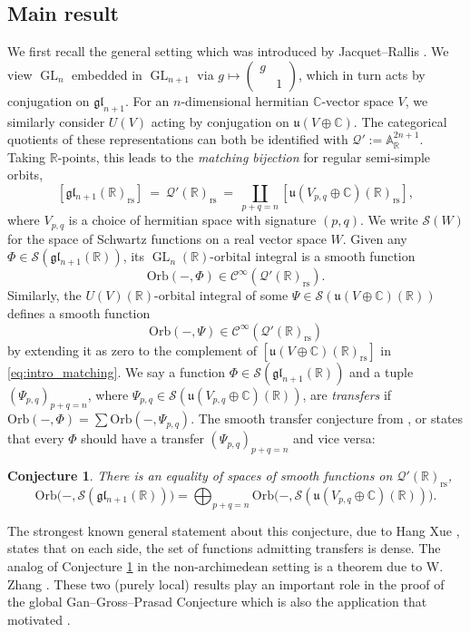 \documentclass[reqno, 11pt]{amsart} %
\numberwithin{equation}{section}
\theoremstyle{plain}
\newtheorem{conjecture}[theorem]{Conjecture}
\theoremstyle{definition}
\theoremstyle{remark}
\newcommand{\mr}{\mathrm}
\newcommand{\mbA}{\mathbb{A}}
\newcommand{\mbC}{\mathbb{C}}
\newcommand{\mbR}{\mathbb{R}}
\newcommand{\mcC}{\mathcal{C}}
\newcommand{\mcQ}{\mathcal{Q}}
\newcommand{\mcS}{\mathcal{S}}
\newcommand{\mfg}{\mathfrak{g}}
\newcommand{\mfl}{\mathfrak{l}}
\newcommand{\mfu}{\mathfrak{u}}
\newcommand{\rs}{\mr{rs}}
\newcommand{\mfgl}{\mfg\mfl}
\newcommand{\bbR}{\mathbb R}
\newcommand{\lie}[1]{ \mathfrak{#1}}
\DeclareMathOperator{\GL}{GL}
\newcommand{\Orb}{\mathrm{Orb}}
\begin{document}
\subsection{Main result}
We first recall the general setting which was introduced by Jacquet--Rallis \cite{JR}. We view $\GL_n$ embedded in $\GL_{n+1}$ via $g\mapsto \left(\begin{smallmatrix} g & \\ & 1\end{smallmatrix}\right)$, which in turn acts by conjugation on $\lie{gl}_{n+1}$. For an $n$-dimensional hermitian $\mbC$-vector space $V$, we similarly consider $U(V)$ acting by conjugation on $\mfu(V\oplus \mbC)$. The categorical quotients of these representations can both be identified with $\mcQ' := \mbA^{2n+1}_\mbR$. Taking $\mbR$-points, this leads to the \emph{matching bijection} for regular semi-simple orbits,
\begin{equation}\label{eq:intro_matching}
[\mfgl_{n+1}(\mbR)_\rs] \ = \ \mcQ'(\mbR)_\rs\ =\ \coprod_{p+q = n} [\mfu(V_{p,q}\oplus \mbC)(\mbR)_\rs],
\end{equation}
where $V_{p,q}$ is a choice of hermitian space with signature $(p,q)$. We write $\mcS(W)$ for the space of Schwartz functions on a real vector space $W$. Given any $Φ\in \mcS(\mfgl_{n+1}(\mbR))$, its $\GL_n(\mbR)$-orbital integral is a smooth function
$$\Orb(-,Φ) \in \mcC^\infty(\mcQ'(\mbR)_\rs).$$
Similarly, the $U(V)(\mbR)$-orbital integral of some $Ψ \in \mcS(\mfu(V\oplus \mbC)(\mbR))$ defines a smooth function
$$\Orb(-,Ψ) \in \mcC^\infty(\mcQ'(\mbR)_\rs)$$
by extending it as zero to the complement of $[\mfu(V\oplus \mbC)(\mbR)_\rs]$ in \eqref{eq:intro_matching}. We say a function $Φ\in \mcS(\lie{gl}_{n+1}(\bbR))$ and a tuple  $(Ψ_{p,q})_{p+q = n}$, where $Ψ_{p,q}\in \mcS(\mfu(V_{p,q}\oplus \mbC)(\mbR))$, are \emph{transfers} if $\Orb(-,Φ) =\sum \Orb(-,Ψ_{p,q})$. The smooth transfer conjecture from \cite{JR}, \cite[\S3.1]{Zhang_GGP} or \cite[Conjecture 3.1]{Xue} states that every $Φ$ should have a transfer $(Ψ_{p,q})_{p+q = n}$ and vice versa:
\begin{conjecture}\label{conj:intro_transfer_all_Schwartz}
There is an equality of spaces of smooth functions on $\mcQ'(\mbR)_\rs$,
$$\Orb\big(-,\mcS(\mfgl_{n+1}(\mbR))\big) = \bigoplus_{p + q = n} \Orb\big(-, \mcS(\mfu(V_{p,q}\oplus \mbC)(\mbR))\big).$$
\end{conjecture}
The strongest known general statement about this conjecture, due to Hang Xue \cite[Theorem 3.3]{Xue}, states that on each side, the set of functions admitting transfers is dense. The analog of Conjecture \ref{conj:intro_transfer_all_Schwartz} in the non-archimedean setting is a theorem due to W. Zhang \cite{Zhang_GGP}. These two (purely local) results play an important role in the proof of the global Gan--Gross--Prasad Conjecture \cite{Zhang_GGP, Xue, BLZZ, BCZ} which is also the application that motivated \cite{JR}.
\end{document}
